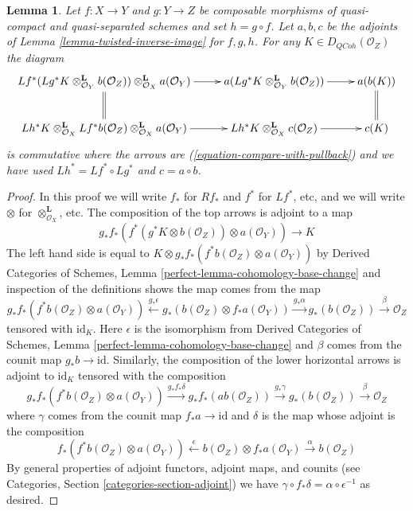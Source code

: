 \documentclass{stacks-project}
\theoremstyle{plain}
\newtheorem{lemma}[subsection]{Lemma}
\theoremstyle{definition}
\theoremstyle{remark}
\numberwithin{equation}{subsection}
\def\QCoh{\mathit{QCoh}}
\begin{document}
\begin{lemma}
\label{lemma-transitivity-compare-with-pullback}
Let $f : X \to Y$ and $g : Y \to Z$ be composable morphisms of quasi-compact
and quasi-separated schemes and set $h = g \circ f$. Let $a, b, c$ be the
adjoints of Lemma \ref{lemma-twisted-inverse-image} for $f, g, h$.
For any $K \in D_\QCoh(\mathcal{O}_Z)$ the diagram
$$
\xymatrix{
Lf^*(Lg^*K \otimes_{\mathcal{O}_Y}^\mathbf{L}
b(\mathcal{O}_Z)) \otimes_{\mathcal{O}_X}^\mathbf{L} a(\mathcal{O}_Y)
\ar@{=}[d] \ar[r] &
a(Lg^*K \otimes_{\mathcal{O}_Y}^\mathbf{L} b(\mathcal{O}_Z)) \ar[r] &
a(b(K)) \ar@{=}[d] \\
Lh^*K \otimes_{\mathcal{O}_X}^\mathbf{L} Lf^*b(\mathcal{O}_Z)
\otimes_{\mathcal{O}_X}^\mathbf{L} a(\mathcal{O}_Y) \ar[r] &
Lh^*K \otimes_{\mathcal{O}_X}^\mathbf{L} c(\mathcal{O}_Z) \ar[r] &
c(K)
}
$$
is commutative where the arrows are (\ref{equation-compare-with-pullback})
and we have used $Lh^* = Lf^* \circ Lg^*$ and $c = a \circ b$.
\end{lemma}

\begin{proof}
In this proof we will write $f_*$ for $Rf_*$ and $f^*$ for $Lf^*$, etc,
and we will write $\otimes$ for $\otimes^\mathbf{L}_{\mathcal{O}_X}$, etc.
The composition of the top arrows is adjoint to a map
$$
g_*f_*(f^*(g^*K \otimes b(\mathcal{O}_Z)) \otimes a(\mathcal{O}_Y)) \to K
$$
The left hand side is equal to
$K \otimes g_*f_*(f^*b(\mathcal{O}_Z) \otimes a(\mathcal{O}_Y))$ by
Derived Categories of Schemes, Lemma
\ref{perfect-lemma-cohomology-base-change}
and inspection of the definitions shows the map comes from the map
$$
g_*f_*(f^*b(\mathcal{O}_Z) \otimes a(\mathcal{O}_Y))
\xleftarrow{g_*\epsilon}
g_*(b(\mathcal{O}_Z) \otimes f_*a(\mathcal{O}_Y)) \xrightarrow{g_*\alpha}
g_*(b(\mathcal{O}_Z)) \xrightarrow{\beta} \mathcal{O}_Z
$$
tensored with $\text{id}_K$. Here $\epsilon$ is the isomorphism from
Derived Categories of Schemes, Lemma
\ref{perfect-lemma-cohomology-base-change} and
$\beta$ comes from the counit map
$g_*b \to \text{id}$. Similarly, the composition of the lower
horizontal arrows is adjoint to $\text{id}_K$ tensored with the composition 
$$
g_*f_*(f^*b(\mathcal{O}_Z) \otimes a(\mathcal{O}_Y)) \xrightarrow{g_*f_*\delta}
g_*f_*(ab(\mathcal{O}_Z)) \xrightarrow{g_*\gamma}
g_*(b(\mathcal{O}_Z)) \xrightarrow{\beta}
\mathcal{O}_Z
$$
where $\gamma$ comes from the counit map $f_*a \to \text{id}$
and $\delta$ is the map whose adjoint is the composition
$$
f_*(f^*b(\mathcal{O}_Z) \otimes a(\mathcal{O}_Y))
\xleftarrow{\epsilon}
b(\mathcal{O}_Z) \otimes f_*a(\mathcal{O}_Y) \xrightarrow{\alpha}
b(\mathcal{O}_Z)
$$
By general properties of adjoint functors, adjoint maps, and counits
(see Categories, Section \ref{categories-section-adjoint})
we have $\gamma \circ f_*\delta = \alpha \circ \epsilon^{-1}$ as desired.
\end{proof}
\end{document}
